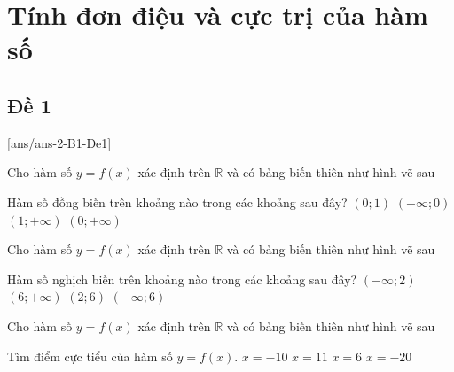 \section{Tính đơn điệu và cực trị của hàm số}
\subsection{Đề 1}
\caulc
{}[ans/ans-2-B1-De1]
\begin{ex}%
	Cho hàm số $y=f(x)$ xác định trên $\mathbb{R}$ và có bảng biến thiên như hình vẽ sau
	\begin{center}
	\end{center}
	Hàm số đồng biến trên khoảng nào trong các khoảng sau đây?
	\choice
	{\True $(0; 1)$}
	{$(-\infty; 0)$}
	{$(1;+\infty)$}
	{$(0;+\infty)$}
\end{ex}
\begin{ex}%
	Cho hàm số $y=f(x)$ xác định trên $\mathbb{R}$ và có bảng biến thiên như hình vẽ sau
\begin{center}
\end{center}
	Hàm số nghịch biến trên khoảng nào trong các khoảng sau đây?
	\choice
	{$(-\infty; 2)$}
	{$(6;+\infty)$}
	{\True $(2; 6)$}
	{$(-\infty; 6)$}
\end{ex}
\begin{ex}%
	Cho hàm số $y=f(x)$ xác định trên $\mathbb{R}$ và có bảng biến thiên như hình vẽ sau
	\begin{center}
		\begin{center}
		\end{center}
	\end{center}
	Tìm điểm cực tiểu của hàm số $y=f(x)$.
	\choice
	{$x=-10$}
	{\True $x=11$}
	{$x=6$}
	{$x=-20$}
\end{ex}
